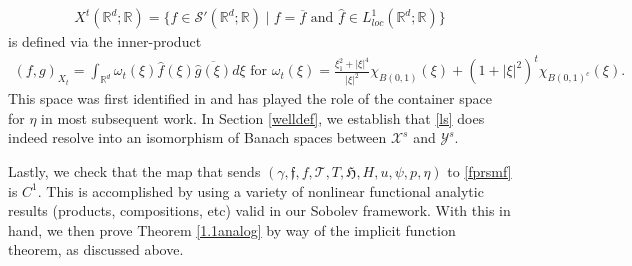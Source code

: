 \documentclass[11pt,letterpaper,reqno]{amsart}
\numberwithin{equation}{section}
\newcommand{\abs}[1]{\left\lvert#1\right\rvert}
\begin{document}
\begin{align} \label{xxs}
    X^{t}(\mathbb{R}^{d};\mathbb{R})=\{f \in \mathscr{S}'(\mathbb{R}^{d};\mathbb{R}) \mid \mbox{\(f=\overline{f}\) and \(\hat{f} \in L_{loc}^{1}(\mathbb{R}^{d};\mathbb{R})\)}\} 
\end{align}
is defined via the inner-product
\begin{align}\label{df}
    (f,g)_{X_{t}}=\int_{\mathbb{R}^{d}}\omega_{t}(\xi)\hat{f}(\xi)\overline{\hat{g}(\xi)}d\xi
\text{ for }  
\omega_{t}(\xi)=\frac{\xi_{1}^{2}+\abs{\xi}^{4}}{\abs{\xi}^{2}}\chi_{B(0,1)}(\xi)+(1+\abs{\xi}^{2})^{t}\chi_{B(0,1)^{c}}(\xi).
\end{align}
This space was first identified in \cite{leoni2023traveling} and has played the role of the container space for $\eta$ in most subsequent work.  In Section \ref{welldef}, we establish that \eqref{ls} does indeed resolve into an isomorphism of Banach spaces between \(\mathcal{X}^{s}\) and \(\mathcal{Y}^{s}\).

Lastly, we check that the map that sends \((\gamma,\mathfrak{f},f, \mathcal{T},T,\mathfrak{H},H, u, \psi,p,\eta)\) to \eqref{fprsmf} is \(C^{1}\).  This is accomplished by using a variety of nonlinear functional analytic results (products, compositions, etc) valid in our Sobolev framework.  With this in hand, we then prove Theorem \ref{1.1analog} by way of the implicit function theorem, as discussed above.
\end{document}
